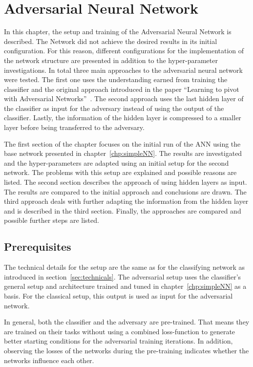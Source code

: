\chapter{Adversarial Neural Network}
\label{chp:ANN}

In this chapter, the setup and training of the Adversarial Neural Network is described. The Network did not achieve the desired results in its initial configuration.
For this reason, different configurations for the implementation of the network structure are presented in addition to the hyper-parameter investigations.
In total three main approaches to the adversarial neural network were tested. The first one uses the understanding earned from training the classifier and the original approach introduced in the paper \enquote{Learning to pivot with Adversarial Networks}~\cite{Louppe:2016ylz}. The second approach uses the last hidden layer of the classifier as input for the adversary instead of using the output of the classifier. Lastly, the information of the hidden layer is compressed to a smaller layer before being transferred to the adversary.

The first section of the chapter focuses on the initial run of the ANN using the base network presented in chapter~\ref{chp:simpleNN}. The results are investigated and the hyper-parameters are adapted using an initial setup for the second network. The problems with this setup are explained and possible reasons are listed.
The second section describes the approach of using hidden layers as input. The results are compared to the initial approach and conclusions are drawn.
The third approach deals with further adapting the information from the hidden layer and is described in the third section.
Finally, the approaches are compared and possible further steps are listed.

\section*{Prerequisites}

The technical details for the setup are the same as for the classifying network as introduced in section~\ref{sec:technicals}.
The adversarial setup uses the classifier's general setup and architecture trained and tuned in chapter~\ref{chp:simpleNN} as a basis. For the classical setup, this output is used as input for the adversarial network.

In general, both the classifier and the adversary are pre-trained. That means they are trained on their tasks without using a combined loss-function to generate better starting conditions for the adversarial training iterations.
In addition, observing the losses of the networks during the pre-training indicates whether the networks influence each other.




